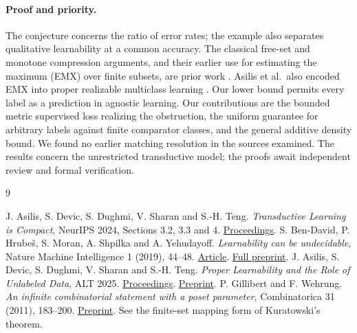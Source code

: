 \documentclass[11pt]{article}
\begin{document}
\paragraph{Proof and priority.}
The conjecture concerns the ratio of error rates; the example also separates qualitative learnability at a common accuracy. The classical free-set and monotone compression arguments, and their earlier use for estimating the maximum (EMX) over finite subsets, are prior work \cite{emx,wehrung}. Asilis et al.\ also encoded EMX into proper realizable multiclass learning \cite[Proposition 4.3, preprint numbering]{proper}. Our lower bound permits every label as a prediction in agnostic learning. Our contributions are the bounded metric supervised loss realizing the obstruction, the uniform guarantee for arbitrary labels against finite comparator classes, and the general additive density bound. We found no earlier matching resolution in the sources examined. The results concern the unrestricted transductive model; the proofs await independent review and formal verification.

\begin{thebibliography}{9}\small\raggedright
{} J. Asilis, S. Devic, S. Dughmi, V. Sharan and S.-H. Teng. \emph{Transductive Learning is Compact}, NeurIPS 2024, Sections 3.2, 3.3 and 4. \href{https://proceedings.neurips.cc/paper_files/paper/2024/hash/eb7295a8bc613b375726659c2ecd6f14-Abstract-Conference.html}{Proceedings}.
 S. Ben-David, P. Hrube\v{s}, S. Moran, A. Shpilka and A. Yehudayoff. \emph{Learnability can be undecidable}, Nature Machine Intelligence 1 (2019), 44--48. \href{https://doi.org/10.1038/s42256-018-0002-3}{Article}. \href{https://arxiv.org/abs/1711.05195}{Full preprint}.
 J. Asilis, S. Devic, S. Dughmi, V. Sharan and S.-H. Teng. \emph{Proper Learnability and the Role of Unlabeled Data}, ALT 2025. \href{https://proceedings.mlr.press/v272/asilis25b.html}{Proceedings}. \href{https://arxiv.org/abs/2502.10359}{Preprint}.
 P. Gillibert and F. Wehrung. \emph{An infinite combinatorial statement with a poset parameter}, Combinatorica 31 (2011), 183--200. \href{https://arxiv.org/abs/0902.4448}{Preprint}. See the finite-set mapping form of Kuratowski's theorem.
\end{thebibliography}
\end{document}
